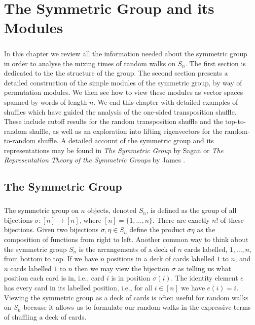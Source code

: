 \documentclass[11pt]{report}
\begin{document}
	\chapter{The Symmetric Group and its Modules}
\label{chpt4:chpt}




\paragraph{}
In this chapter we review all the information needed about the symmetric group in order to analyse the mixing times of random walks on $S_{n}$. The first section is dedicated to the  the structure of the group. 	The second section presents a detailed construction of the simple modules of the symmetric group, by way of permutation modules. We then see how to view these modules as vector spaces spanned by words of length $n$. We end this chapter with detailed examples of shuffles which have guided the analysis of the one-sided transposition shuffle. These include cutoff results for the random transposition shuffle and the top-to-random shuffle, as well as an exploration into lifting eigenvectors for the random-to-random shuffle. A detailed account of the symmetric group and its representations may be found in \emph{The Symmetric Group} by Sagan \cite{sagan2013symmetric} or \emph{The Representation Theory of the Symmetric Groups} by James \cite{james1978representation}. 



\section{The Symmetric Group}
\label{chpt4:sec:symgp}








\paragraph{}
The symmetric group on $n$ objects, denoted $S_{n}$, is defined as the 
group of all bijections $\sigma:[n]\to[n]$, where $[n] = \{1,\ldots, n\}$. There are exactly $n!$ of 
these  bijections. Given two bijections 
$\sigma,\eta \in S_{n}$ define the product $\sigma \eta$ as the composition of functions from right to left.
Another common way to think about the symmetric group 
$S_{n}$ is the arrangements of a deck of $n$ cards labelled, $1,\ldots, n$, from bottom to top. If we have $n$ 
positions in a deck of cards labelled $1$ to $n$, and $n$ cards labelled 
$1$ to $n$ then we may 
view the bijection $\sigma$ as telling us what position each card is in, i.e., card $i$ is in position $\sigma(i)$. The identity element $e$ has every card in 
its labelled position, i.e., for all $i \in [n]$ we have $e(i) = i$. 
Viewing the symmetric group as a deck of cards is often 
useful for random walks on $S_{n}$ because it allows us to formulate our random walks in the expressive terms of shuffling a deck of cards.
\end{document}
